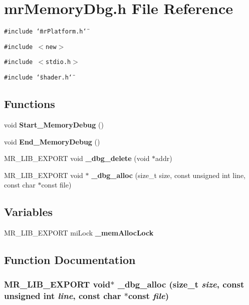 \section{mr\-Memory\-Dbg.h File Reference}
\label{mrMemoryDbg_8h}
{\tt \#include \char`\"{}mr\-Platform.h\char`\"{}}\par
{\tt \#include $<$new$>$}\par
{\tt \#include $<$stdio.h$>$}\par
{\tt \#include \char`\"{}shader.h\char`\"{}}\par
\subsection*{Functions}
\begin{CompactItemize}
\item 
void {\bf Start\_\-Memory\-Debug} ()
\item 
void {\bf End\_\-Memory\-Debug} ()
\item 
MR\_\-LIB\_\-EXPORT void {\bf \_\-dbg\_\-delete} (void $\ast$addr)
\item 
MR\_\-LIB\_\-EXPORT void $\ast$ {\bf \_\-dbg\_\-alloc} (size\_\-t size, const unsigned int line, const char $\ast$const file)
\end{CompactItemize}
\subsection*{Variables}
\begin{CompactItemize}
\item 
MR\_\-LIB\_\-EXPORT mi\-Lock {\bf \_\-mem\-Alloc\-Lock}
\end{CompactItemize}


\subsection{Function Documentation}
\subsubsection{\setlength{\rightskip}{0pt plus 5cm}MR\_\-LIB\_\-EXPORT void$\ast$ \_\-dbg\_\-alloc (size\_\-t {\em size}, const unsigned int {\em line}, const char $\ast$const {\em file})}\label{mrMemoryDbg_8h_a4}



